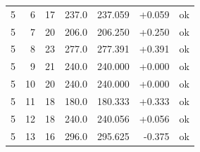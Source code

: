 \begin{longtable}{rrrrrrl}
5 & 6 & 17 & 237.0 & 237.059 & +0.059 & ok \\
5 & 7 & 20 & 206.0 & 206.250 & +0.250 & ok \\
5 & 8 & 23 & 277.0 & 277.391 & +0.391 & ok \\
5 & 9 & 21 & 240.0 & 240.000 & +0.000 & ok \\
5 & 10 & 20 & 240.0 & 240.000 & +0.000 & ok \\
5 & 11 & 18 & 180.0 & 180.333 & +0.333 & ok \\
5 & 12 & 18 & 240.0 & 240.056 & +0.056 & ok \\
5 & 13 & 16 & 296.0 & 295.625 & -0.375 & ok \\
\end{longtable}
